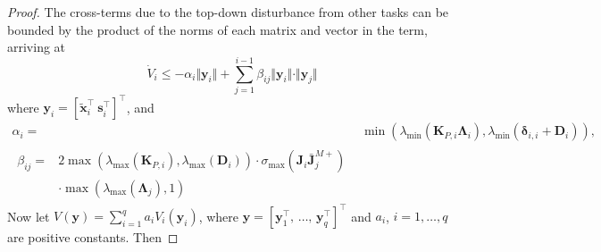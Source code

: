 \documentclass[../main.tex]{subfiles}
\begin{document}
\begin{proof}
    The cross-terms due to the top-down disturbance from other tasks can be bounded by the product of the norms of each matrix and vector in the term, arriving at
    \begin{equation}
        \dot{V}_i \leq -\alpha_i \Vert \bm{y}_i \Vert + \sum_{j=1}^{i-1} \beta_{ij} \Vert \bm{y}_i \Vert \cdot \Vert \bm{y}_j \Vert
    \end{equation}
    where $\bm{y}_i = \left[ \tilde{\bm{x}}_i^\top \ \bm{s}_i^\top \right]^\top$, and
    \begin{subequations}\label{eq:comp:alphabeta}
        \begin{align}
            \alpha_i ={}& \min \left( \lambda_{\min}(\bm{K}_{P,i} \bm{\Lambda}_i), \lambda_{\min}(\bm{\delta}_{i,i} + \bm{D}_i)\right),\\
            \begin{split}
                \beta_{ij}
                ={}& 2 \max \left( \lambda_{\max}(\bm{K}_{P,i} ), \lambda_{\max}(\bm{D}_i)\right)\cdot \sigma_{\max}( \bm{J}_i \bar{\bm{J}}_j^{M+} ) \\
                &\cdot \max \left( \lambda_{\max}(\bm{\Lambda}_j),1\right)
            \end{split}
        \end{align}
    \end{subequations}
    Now let $V(\bm{y}) = \sum_{i=1}^{q} a_i V_i(\bm{y}_i)$, where $\bm{y} = [\bm{y}_1^\top,\, \ldots,\, \bm{y}_q^\top]^\top$  and $a_i$, $i=1,\ldots,q$ are positive constants. Then

\end{proof}
\end{document}
